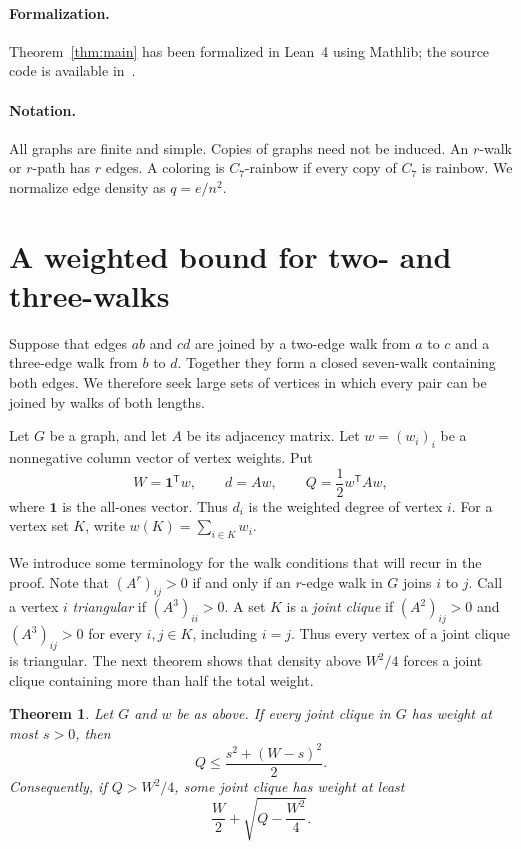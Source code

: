 \documentclass[10pt]{article}
\newtheorem{thm}{Theorem}[section]
\theoremstyle{remark}
\begin{document}
\paragraph{Formalization.} Theorem~\ref{thm:main} has been formalized in Lean~4 using Mathlib; the source code is available in~\cite{Formalization}.

\paragraph{Notation.} All graphs are finite and simple. Copies of graphs need not be induced. An $r$-walk or $r$-path has $r$ edges. A coloring is $C_7$-rainbow if every copy of $C_7$ is rainbow. We normalize edge density as $q=e/n^2$.

\section{A weighted bound for two- and three-walks}\label{sec:clique}

Suppose that edges $ab$ and $cd$ are joined by a two-edge walk from $a$ to $c$ and a three-edge walk from $b$ to $d$. Together they form a closed seven-walk containing both edges. We therefore seek large sets of vertices in which every pair can be joined by walks of both lengths.

Let $G$ be a graph, and let $A$ be its adjacency matrix. Let $w=(w_i)_i$ be a nonnegative column vector of vertex weights. Put
\[
 W=\mathbf1^{\mathsf T}w,\qquad d=Aw,\qquad
 Q=\frac12w^{\mathsf T}Aw,
\]
where $\mathbf1$ is the all-ones vector. Thus $d_i$ is the weighted degree of vertex $i$. For a vertex set $K$, write $w(K)=\sum_{i\in K}w_i$.

We introduce some terminology for the walk conditions that will recur in the proof. Note that $(A^r)_{ij}>0$ if and only if an $r$-edge walk in $G$ joins $i$ to $j$. Call a vertex $i$ \emph{triangular} if $(A^3)_{ii}>0$. A set $K$ is a \emph{joint clique} if $(A^2)_{ij}>0$ and $(A^3)_{ij}>0$ for every $i,j\in K$, including $i=j$. Thus every vertex of a joint clique is triangular. The next theorem shows that density above $W^2/4$ forces a joint clique containing more than half the total weight.

\begin{thm}\label{thm:joint}
Let $G$ and $w$ be as above. If every joint clique in $G$ has weight at most $s>0$, then
\begin{equation}\label{eq:jointcap}
 Q\le \frac{s^2+(W-s)^2}{2}.
\end{equation}
Consequently, if $Q>W^2/4$, some joint clique has weight at least
\begin{equation}\label{eq:jointroot}
 \frac W2+\sqrt{Q-\frac{W^2}{4}}.
\end{equation}
\end{thm}
\end{document}
